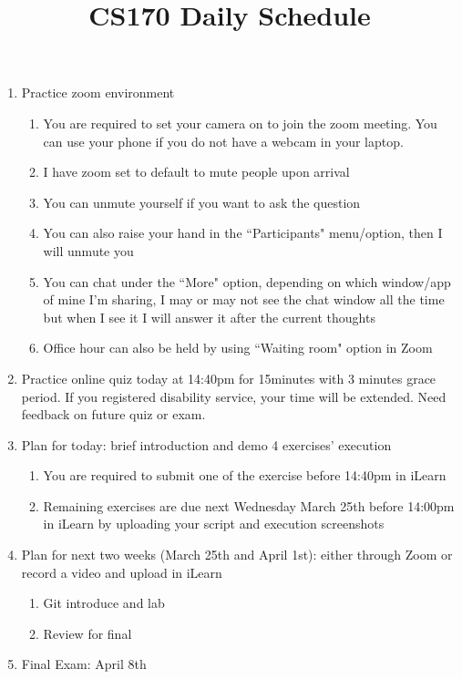\documentclass[11pt]{article}
\title{CS170 Daily Schedule}
\author{}
\begin{document}
\maketitle
\begin{enumerate}
\item Practice zoom environment
\begin{enumerate}
\item You are required to set your camera on to join the zoom meeting. You can use your phone if you do not have a webcam in your laptop.
\item I have zoom set to default to mute people upon arrival
\item You can unmute yourself if you want to ask the question
\item You can also raise your hand in the ``Participants" menu/option, then I will unmute you
\item You can chat under the ``More" option, depending on which window/app of mine I'm sharing, I may or may not see the chat window all the time but when I see it I will answer it after the current thoughts
\item Office hour can also be held by using ``Waiting room" option in Zoom 
\end{enumerate}
\item Practice online quiz today at 14:40pm for 15minutes with 3 minutes grace period. If you registered disability service, your time will be extended. Need feedback on future quiz or exam.
\item Plan for today: brief introduction and demo 4 exercises' execution
\begin{enumerate}
\item You are required to submit one of the exercise before 14:40pm in iLearn
\item Remaining exercises are due next Wednesday March 25th before 14:00pm in iLearn by uploading your script and execution screenshots
\end{enumerate}
\item Plan for next two weeks (March 25th and April 1st): either through Zoom or record a video and upload in iLearn
\begin{enumerate}
\item Git introduce and lab
\item Review for final
\end{enumerate}
\item Final Exam: April 8th
\end{enumerate}
\end{document}
